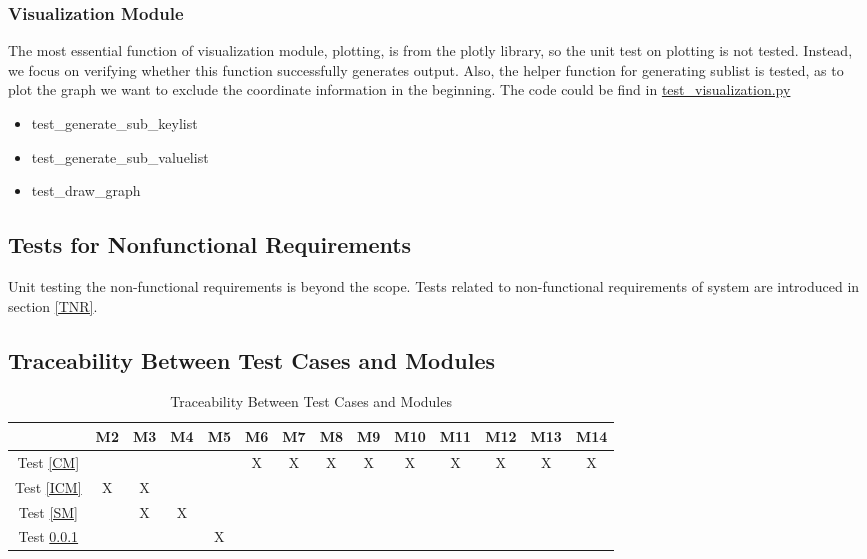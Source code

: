 \documentclass[12pt, titlepage]{article}
\begin{document}
\subsubsection{Visualization Module} \label{VM}
The most essential function of visualization module, plotting, is from the plotly library, so the unit test on plotting is not tested. Instead, we focus on verifying whether this function successfully generates output. Also, the helper function for generating sublist is tested, as to plot the graph we want to exclude the coordinate information in the beginning. The code could be find in \href{https://github.com/CynthiaLiu0805/BridgeCorrosion/blob/main/tests/test_visualization.py}{test\_visualization.py}
\begin{itemize}
\item test\_generate\_sub\_keylist
\item test\_generate\_sub\_valuelist
\item test\_draw\_graph
\end{itemize}


\subsection{Tests for Nonfunctional Requirements}
Unit testing the non-functional requirements is beyond the scope. Tests related to non-functional requirements of system are introduced in section \ref{TNR}.

\subsection{Traceability Between Test Cases and Modules}

\begin{table}[h]
\centering
\begin{tabular}{|c|c|c|c|c|c|c|c|c|c|c|c|c|c|}
\hline
	& M2 & M3 & M4  & M5 & M6 & M7 & M8 & M9 & M10 & M11 & M12 & M13 & M14 \\
\hline

Test \ref{CM}    & &  &  &  & X & X & X & X & X & X & X & X & X \\ \hline
Test \ref{ICM} & X & X &  &  &  &  & &  &  &  &  &  & \\ \hline
Test \ref{SM} & & X & X &  &  &  & &  &  &  &  &  & \\ \hline
Test \ref{VM} & &  &  & X &  &  & &  &  &  &  &  & \\ \hline

\end{tabular}
\caption{Traceability Between Test Cases and Modules}
\label{Table:test_modules}
\end{table}
\end{document}
